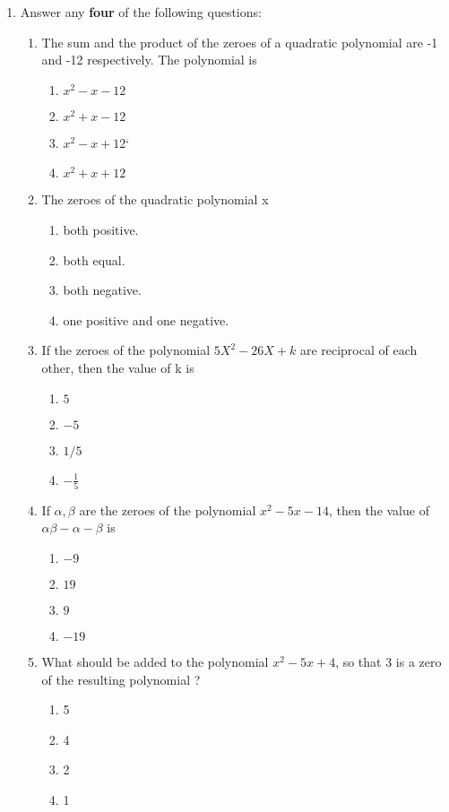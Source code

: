 \documentclass{article}
\begin{document}
\begin{enumerate}
\item Answer any \textbf{four} of the following questions:
\begin{enumerate}  
\item The sum and the product of the zeroes of a quadratic polynomial are -1 and -12 respectively. The polynomial is 
\begin{enumerate}  
\item $x^2-x-12$
\item $x^2+x-12$
\item $x^2-x+12$`
\item $x^2+x+12$
\end{enumerate}  
\item The zeroes of the quadratic polynomial x
\begin{enumerate}  
\item both positive.
\item both equal.
\item both negative.
\item one positive and one negative.  
\end{enumerate}  
\item  If the zeroes of the polynomial $5X^2-26X+k$ are reciprocal of each other, then the value of k is 
\begin{enumerate}  
\item $5$
\item $-5$
\item  $1/5$
\item $-\frac{1}{5}$
\end{enumerate}  
\item   If $\alpha,\beta$ are the zeroes of the polynomial $x^2-5x-14$, then the value of $\alpha\beta-\alpha-\beta$ is
\begin{enumerate}  
\item $-9$
\item $19$
\item  $9$
\item $-19$
\end{enumerate}  
\item What should be added to the polynomial $x^2-5x+4$, so that 3 is a zero of the resulting polynomial ? 
\begin{enumerate}  
\item 5
\item 4
\item 2
\item 1
\end{enumerate} 
\end{enumerate}


\end{enumerate}
\end{document}
